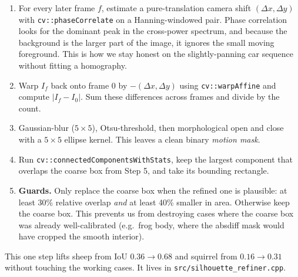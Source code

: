\documentclass[11pt,a4paper]{article}
\begin{document}
\begin{enumerate}\itemsep2pt
\item For every later frame $f$, estimate a pure-translation camera
  shift $(\Delta x, \Delta y)$ with \texttt{cv::phaseCorrelate} on a
  Hanning-windowed pair. Phase correlation looks for the dominant
  peak in the cross-power spectrum, and because the background is the
  larger part of the image, it ignores the small moving foreground.
  This is how we stay honest on the slightly-panning car sequence
  without fitting a homography.
\item Warp $I_f$ back onto frame 0 by $-(\Delta x,\Delta y)$ using
  \texttt{cv::warpAffine} and compute $|I_f - I_0|$. Sum these
  differences across frames and divide by the count.
\item Gaussian-blur ($5{\times}5$), Otsu-threshold, then morphological
  open and close with a $5{\times}5$ ellipse kernel. This leaves a
  clean binary \emph{motion mask}.
\item Run \texttt{cv::connectedComponentsWithStats}, keep the largest
  component that overlaps the coarse box from Step 5, and take its
  bounding rectangle.
\item \textbf{Guards.} Only replace the coarse box when the refined
  one is plausible: at least 30\% relative overlap \emph{and} at
  least 40\% smaller in area. Otherwise keep the coarse box. This
  prevents us from destroying cases where the coarse box was already
  well-calibrated (e.g.\ frog body, where the absdiff mask would have
  cropped the smooth interior).
\end{enumerate}

This one step lifts sheep from IoU $0.36 \to 0.68$ and squirrel from
$0.16 \to 0.31$ without touching the working cases. It lives in
\texttt{src/silhouette\_refiner.cpp}.
\end{document}
